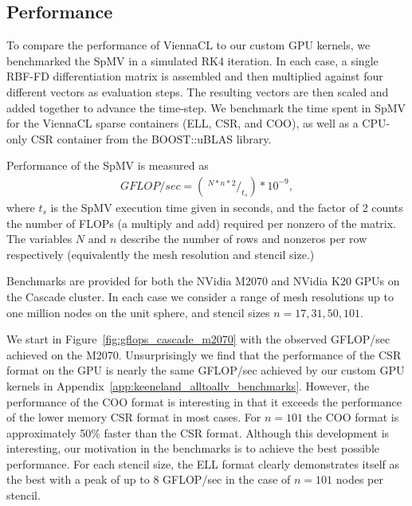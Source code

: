 \documentclass{report}
\begin{document}
\subsection{Performance}
To compare the performance of ViennaCL to our custom GPU kernels, we benchmarked the SpMV in a simulated RK4 iteration. In each case, a single RBF-FD differentiation matrix is assembled and then multiplied against four different vectors as evaluation steps. The resulting vectors are then scaled and added together to advance the time-step. We benchmark the time spent in SpMV for the ViennaCL sparse containers (ELL, CSR, and COO), as well as a CPU-only CSR container from the BOOST::uBLAS library. 

Performance of the SpMV is measured as
\begin{align}
GFLOP/sec = (\ ^{N * n * 2} /_{t_{s}} ) * 10^{-9},
\end{align}
where $t_{s}$ is the SpMV execution time given in seconds, and the factor of 2 counts the number of FLOPs (a multiply and add) required per nonzero of the matrix. The variables $N$ and $n$ describe the number of rows and nonzeros per row respectively (equivalently the mesh resolution and stencil size.)

Benchmarks are provided for both the NVidia M2070 and NVidia K20 GPUs on the Cascade cluster. In each case we consider a range of mesh resolutions up to one million nodes on the unit sphere, and stencil sizes $n=17, 31, 50, 101$. 

We start in Figure~\ref{fig:gflops_cascade_m2070} with the observed GFLOP/sec achieved on the M2070. Unsurprisingly we find that the performance of the CSR format on the GPU is nearly the same GFLOP/sec achieved by our custom GPU kernels in Appendix~\ref{app:keeneland_alltoallv_benchmarks}. However, the performance of the COO format is interesting in that it exceeds the performance of the lower memory CSR format in most cases. For $n=101$ the COO format is approximately 50\% faster than the CSR format. Although this development is interesting, our motivation in the benchmarks is to achieve the best possible performance. For each stencil size, the ELL format clearly demonstrates itself as the best with a peak of up to 8 GFLOP/sec in the case of $n=101$ nodes per stencil.
\end{document}
